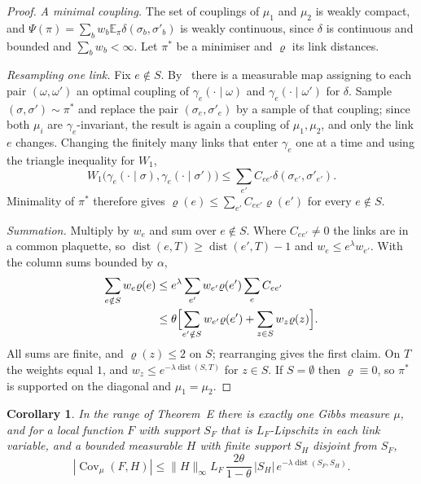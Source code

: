 \documentclass[aps,prd,twocolumn,superscriptaddress,nofootinbib,longbibliography,floatfix,amsmath,amssymb,10pt]{revtex4-2}
\newtheorem{corollary}[theorem]{Corollary}
\theoremstyle{definition}
\theoremstyle{remark}
\newcommand{\E}{\mathbb{E}}
\newcommand{\Cov}{\operatorname{Cov}}
\newcommand{\dist}{\operatorname{dist}}
\begin{document}
\begin{proof}
\emph{A minimal coupling.} The set of couplings of $\mu_1$ and $\mu_2$ is
weakly compact, and $\Psi(\pi)=\sum_bw_b\E_\pi\delta(\sigma_b,\sigma'_b)$ is
weakly continuous, since $\delta$ is continuous and bounded and $\sum_bw_b<
\infty$. Let $\pi^*$ be a minimiser and $\varrho$ its link distances.

\emph{Resampling one link.} Fix $e\notin S$. By~\cite[Cor.~5.22]{Vil09}
there is a measurable map assigning to each pair $(\omega,\omega')$ an
optimal coupling of $\gamma_e(\cdot\mid\omega)$ and $\gamma_e(\cdot\mid
\omega')$ for $\delta$. Sample $(\sigma,\sigma')\sim\pi^*$ and replace the pair
$(\sigma_e,\sigma'_e)$ by a sample of that coupling; since both $\mu_i$ are
$\gamma_e$-invariant, the result is again a coupling of $\mu_1,\mu_2$, and only
the link $e$ changes. Changing the finitely many links that enter
$\gamma_e$ one at a time and using the triangle inequality for $W_1$,
\[
W_1\bigl(\gamma_e(\cdot\mid\sigma),\gamma_e(\cdot\mid\sigma')\bigr)\le
\sum_{e'}C_{ee'}\delta(\sigma_{e'},\sigma'_{e'}).
\]
Minimality of $\pi^*$ therefore gives $\varrho(e)\le\sum_{e'}C_{ee'}
\varrho(e')$ for every $e\notin S$.

\emph{Summation.} Multiply by $w_e$ and sum over $e\notin S$. Where
$C_{ee'}\ne0$ the links are in a common plaquette, so $\dist(e,T)\ge\dist(e',
T)-1$ and $w_e\le e^\lambda w_{e'}$. With the column sums bounded by
$\alpha$,
\[
\begin{aligned}
\sum_{e\notin S}w_e\varrho(e)&\le e^\lambda\sum_{e'}w_{e'}\varrho(e')\sum_eC_{ee'}\\
&\le\theta\Bigl[\sum_{e'\notin S}w_{e'}\varrho(e')+\sum_{z\in S}w_z\varrho(z)
\Bigr].
\end{aligned}
\]
All sums are finite, and $\varrho(z)\le2$ on $S$; rearranging gives the first
claim. On $T$ the weights equal $1$, and $w_z\le e^{-\lambda\dist(S,T)}$ for
$z\in S$. If $S=\emptyset$ then $\varrho\equiv0$, so $\pi^*$ is supported on the
diagonal and $\mu_1=\mu_2$.
\end{proof}

\begin{corollary}\label{cor:decay}
In the range of Theorem~E there is exactly one Gibbs measure $\mu$, and for
a local function $F$ with support $S_F$ that is $L_F$-Lipschitz in each
link variable, and a bounded measurable $H$ with finite support $S_H$
disjoint from $S_F$,
\[
|\Cov_\mu(F,H)|\le\|H\|_\infty L_F\,\frac{2\theta}{1-\theta}\,|S_H|\,
e^{-\lambda\dist(S_F,S_H)} .
\]
\end{corollary}
\end{document}
